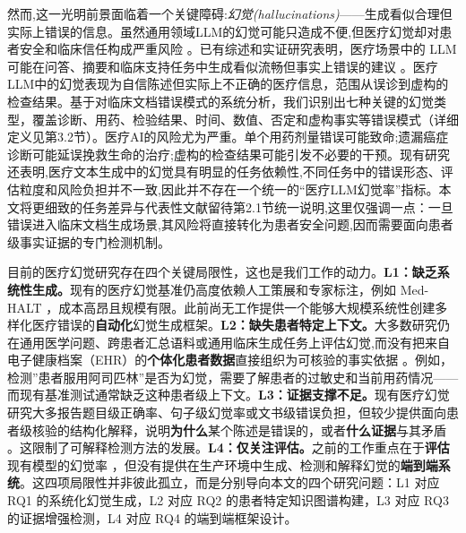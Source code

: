 \documentclass[11pt]{article}
\begin{document}
然而,这一光明前景面临着一个关键障碍:\emph{幻觉(hallucinations)}------生成看似合理但实际上错误的信息。虽然通用领域LLM的幻觉可能只造成不便,但医疗幻觉却对患者安全和临床信任构成严重风险 \citep{alkaissi2023chatgptHallucinations}。已有综述和实证研究表明，医疗场景中的 LLM 可能在问答、摘要和临床支持任务中生成看似流畅但事实上错误的建议 \citep{thirunavukarasu2023llmMedicine,rajpurkar2022aiHealthMedicine}。医疗LLM中的幻觉表现为自信陈述但实际上不正确的医疗信息，范围从误诊到虚构的检查结果。基于对临床文档错误模式的系统分析，我们识别出七种关键的幻觉类型，覆盖诊断、用药、检验结果、时间、数值、否定和虚构事实等错误模式（详细定义见第3.2节）。医疗AI的风险尤为严重。单个用药剂量错误可能致命;遗漏癌症诊断可能延误挽救生命的治疗;虚构的检查结果可能引发不必要的干预。现有研究还表明,医疗文本生成中的幻觉具有明显的任务依赖性,不同任务中的错误形态、评估粒度和风险负担并不一致,因此并不存在一个统一的``医疗LLM幻觉率''指标。本文将更细致的任务差异与代表性文献留待第2.1节统一说明,这里仅强调一点：一旦错误进入临床文档生成场景,其风险将直接转化为患者安全问题,因而需要面向患者级事实证据的专门检测机制。

目前的医疗幻觉研究存在四个关键局限性，这也是我们工作的动力。\textbf{L1：缺乏系统性生成。}现有的医疗幻觉基准仍高度依赖人工策展和专家标注，例如 Med-HALT \citep{pal2023medHalt}，成本高昂且规模有限。此前尚无工作提供一个能够大规模系统性创建多样化医疗错误的\textbf{自动化}幻觉生成框架。\textbf{L2：缺失患者特定上下文。}大多数研究仍在通用医学问题、跨患者汇总语料或通用临床生成任务上评估幻觉,而没有把来自电子健康档案（EHR）的\textbf{个体化患者数据}直接组织为可核验的事实依据 \citep{rotmensch2017healthKnowledgeGraph,finlayson2014graphMedicine}。例如，检测''患者服用阿司匹林''是否为幻觉，需要了解患者的过敏史和当前用药情况------而现有基准测试通常缺乏这种患者级上下文。\textbf{L3：证据支撑不足。}现有医疗幻觉研究大多报告题目级正确率、句子级幻觉率或文书级错误负担，但较少提供面向患者级核验的结构化解释，说明\textbf{为什么}某个陈述是错误的，或者\textbf{什么证据}与其矛盾 \citep{tonekaboni2019cliniciansWant,asgari2025clinicalSafetySummarisation,williams2025dischargeSummaries}。这限制了可解释检测方法的发展。\textbf{L4：仅关注评估。}之前的工作重点在于\textbf{评估}现有模型的幻觉率 \citep{pal2023medHalt}，但没有提供在生产环境中生成、检测和解释幻觉的\textbf{端到端系统}。这四项局限性并非彼此孤立，而是分别导向本文的四个研究问题：L1 对应 RQ1 的系统化幻觉生成，L2 对应 RQ2 的患者特定知识图谱构建，L3 对应 RQ3 的证据增强检测，L4 对应 RQ4 的端到端框架设计。
\end{document}

